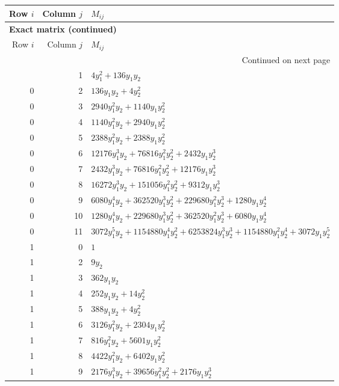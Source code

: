 \documentclass[10pt,a4paper]{article}
\begin{document}
{\small\setlength{\tabcolsep}{7pt}\begin{longtable}{rrp{125mm}}
\toprule Row $i$ & Column $j$ & $M_{ij}$\\\midrule\endfirsthead
\multicolumn{3}{l}{\textbf{Exact matrix (continued)}}\\
\toprule Row $i$ & Column $j$ & $M_{ij}$\\\midrule\endhead
\midrule\multicolumn{3}{r}{Continued on next page}\\\endfoot\bottomrule\endlastfoot
0 & 1 & $4 y_{1}^{2} + 136 y_{1} y_{2}$\\
0 & 2 & $136 y_{1} y_{2} + 4 y_{2}^{2}$\\
0 & 3 & $2940 y_{1}^{2} y_{2} + 1140 y_{1} y_{2}^{2}$\\
0 & 4 & $1140 y_{1}^{2} y_{2} + 2940 y_{1} y_{2}^{2}$\\
0 & 5 & $2388 y_{1}^{2} y_{2} + 2388 y_{1} y_{2}^{2}$\\
0 & 6 & $12176 y_{1}^{3} y_{2} + 76816 y_{1}^{2} y_{2}^{2} + 2432 y_{1} y_{2}^{3}$\\
0 & 7 & $2432 y_{1}^{3} y_{2} + 76816 y_{1}^{2} y_{2}^{2} + 12176 y_{1} y_{2}^{3}$\\
0 & 8 & $16272 y_{1}^{3} y_{2} + 151056 y_{1}^{2} y_{2}^{2} + 9312 y_{1} y_{2}^{3}$\\
0 & 9 & $6080 y_{1}^{4} y_{2} + 362520 y_{1}^{3} y_{2}^{2} + 229680 y_{1}^{2} y_{2}^{3} + 1280 y_{1} y_{2}^{4}$\\
0 & 10 & $1280 y_{1}^{4} y_{2} + 229680 y_{1}^{3} y_{2}^{2} + 362520 y_{1}^{2} y_{2}^{3} + 6080 y_{1} y_{2}^{4}$\\
0 & 11 & $3072 y_{1}^{5} y_{2} + 1154880 y_{1}^{4} y_{2}^{2} + 6253824 y_{1}^{3} y_{2}^{3} + 1154880 y_{1}^{2} y_{2}^{4} + 3072 y_{1} y_{2}^{5}$\\
1 & 0 & $1$\\
1 & 2 & $9 y_{2}$\\
1 & 3 & $362 y_{1} y_{2}$\\
1 & 4 & $252 y_{1} y_{2} + 14 y_{2}^{2}$\\
1 & 5 & $388 y_{1} y_{2} + 4 y_{2}^{2}$\\
1 & 6 & $3126 y_{1}^{2} y_{2} + 2304 y_{1} y_{2}^{2}$\\
1 & 7 & $816 y_{1}^{2} y_{2} + 5601 y_{1} y_{2}^{2}$\\
1 & 8 & $4422 y_{1}^{2} y_{2} + 6402 y_{1} y_{2}^{2}$\\
1 & 9 & $2176 y_{1}^{3} y_{2} + 39656 y_{1}^{2} y_{2}^{2} + 2176 y_{1} y_{2}^{3}$\\

\end{longtable}}
\end{document}
